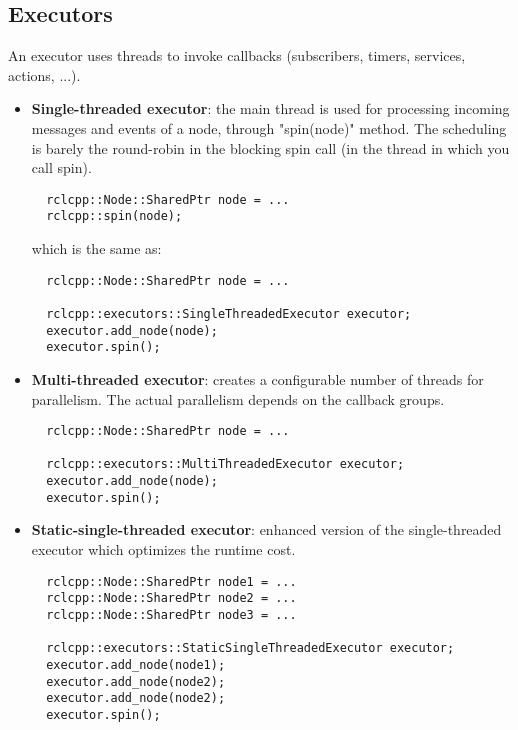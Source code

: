   \subsection*{Executors}

    An executor uses threads to invoke callbacks (subscribers, timers, services, actions, ...).

    \begin{itemize}
      \item \textbf{Single-threaded executor}: the main thread is used for processing incoming messages and events of a node, through "spin(node)" method. The scheduling is barely the round-robin in the blocking spin call (in the thread in which you call spin).

        \begin{verbatim}
  rclcpp::Node::SharedPtr node = ...
  rclcpp::spin(node);
        \end{verbatim}

        which is the same as:

        \begin{verbatim}
  rclcpp::Node::SharedPtr node = ...

  rclcpp::executors::SingleThreadedExecutor executor;
  executor.add_node(node);
  executor.spin();
        \end{verbatim}

      \item \textbf{Multi-threaded executor}: creates a configurable number of threads for parallelism. The actual parallelism depends on the callback groups.
        \begin{verbatim}
  rclcpp::Node::SharedPtr node = ...

  rclcpp::executors::MultiThreadedExecutor executor;
  executor.add_node(node);
  executor.spin();
      \end{verbatim}

      \item \textbf{Static-single-threaded executor}: enhanced version of the single-threaded executor which optimizes the runtime cost.
        \begin{verbatim}
  rclcpp::Node::SharedPtr node1 = ...
  rclcpp::Node::SharedPtr node2 = ...
  rclcpp::Node::SharedPtr node3 = ...

  rclcpp::executors::StaticSingleThreadedExecutor executor;
  executor.add_node(node1);
  executor.add_node(node2);
  executor.add_node(node2);
  executor.spin();
        \end{verbatim}

    \end{itemize}


